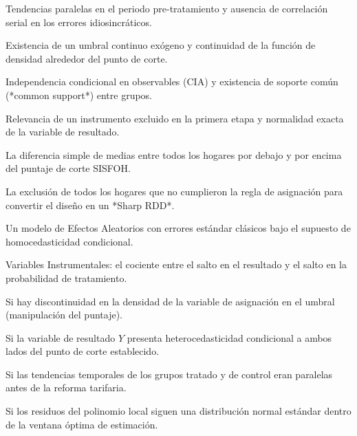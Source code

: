 \begin{opts}
    \item Tendencias paralelas en el periodo pre-tratamiento y ausencia de correlación serial en los errores idiosincráticos.
    \item Existencia de un umbral continuo exógeno y continuidad de la función de densidad alrededor del punto de corte.
    \item Independencia condicional en observables (CIA) y existencia de soporte común (*common support*) entre grupos.
    \item Relevancia de un instrumento excluido en la primera etapa y normalidad exacta de la variable de resultado.
\end{opts}

\begin{opts}
    \item La diferencia simple de medias entre todos los hogares por debajo y por encima del puntaje de corte SISFOH.
    \item La exclusión de todos los hogares que no cumplieron la regla de asignación para convertir el diseño en un *Sharp RDD*.
    \item Un modelo de Efectos Aleatorios con errores estándar clásicos bajo el supuesto de homocedasticidad condicional.
    \item Variables Instrumentales: el cociente entre el salto en el resultado y el salto en la probabilidad de tratamiento.
\end{opts}

\begin{opts}
    \item Si hay discontinuidad en la densidad de la variable de asignación en el umbral (manipulación del puntaje).
    \item Si la variable de resultado $Y$ presenta heterocedasticidad condicional a ambos lados del punto de corte establecido.
    \item Si las tendencias temporales de los grupos tratado y de control eran paralelas antes de la reforma tarifaria.
    \item Si los residuos del polinomio local siguen una distribución normal estándar dentro de la ventana óptima de estimación.
\end{opts}

